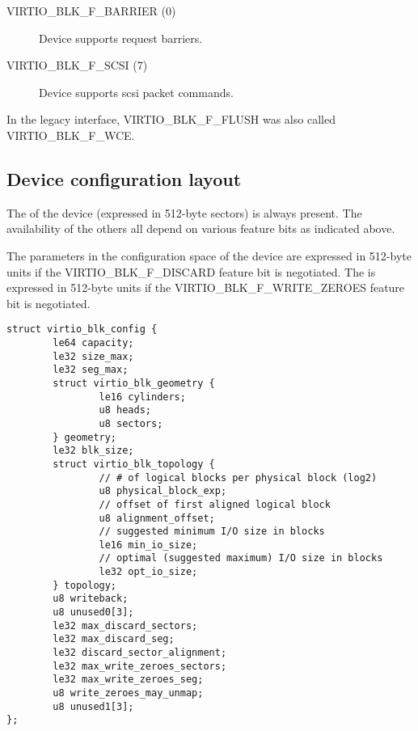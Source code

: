 \begin{description}
\item[VIRTIO_BLK_F_BARRIER (0)] Device supports request barriers.

\item[VIRTIO_BLK_F_SCSI (7)] Device supports scsi packet commands.
\end{description}

\begin{note}
  In the legacy interface, VIRTIO_BLK_F_FLUSH was also
  called VIRTIO_BLK_F_WCE.
\end{note}

\subsection{Device configuration layout}\label{sec:Device Types / Block Device / Device configuration layout}

The  of the device (expressed in 512-byte sectors) is always
present. The availability of the others all depend on various feature
bits as indicated above.

The parameters in the configuration space of the device 
 are expressed in 512-byte units if the
VIRTIO_BLK_F_DISCARD feature bit is negotiated. The 
is expressed in 512-byte units if the VIRTIO_BLK_F_WRITE_ZEROES feature
bit is negotiated.

\begin{lstlisting}
struct virtio_blk_config {
        le64 capacity;
        le32 size_max;
        le32 seg_max;
        struct virtio_blk_geometry {
                le16 cylinders;
                u8 heads;
                u8 sectors;
        } geometry;
        le32 blk_size;
        struct virtio_blk_topology {
                // # of logical blocks per physical block (log2)
                u8 physical_block_exp;
                // offset of first aligned logical block
                u8 alignment_offset;
                // suggested minimum I/O size in blocks
                le16 min_io_size;
                // optimal (suggested maximum) I/O size in blocks
                le32 opt_io_size;
        } topology;
        u8 writeback;
        u8 unused0[3];
        le32 max_discard_sectors;
        le32 max_discard_seg;
        le32 discard_sector_alignment;
        le32 max_write_zeroes_sectors;
        le32 max_write_zeroes_seg;
        u8 write_zeroes_may_unmap;
        u8 unused1[3];
};
\end{lstlisting}


